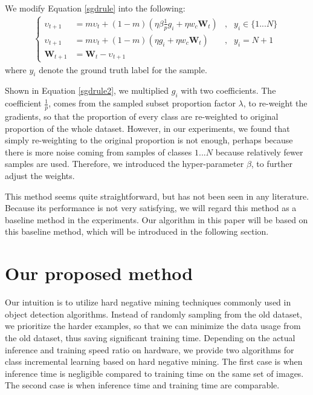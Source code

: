 We modify Equation \ref{sgdrule} into the following:
\begin{align}
\left\{
\begin{aligned}
\upsilon_{t+1} &= m\upsilon_t + (1-m)\left( \eta\beta\frac{1}{p} g_i + \eta w_c \mathbf{W}_t \right)&, &   y_i \in \{1...N\}\\
\upsilon_{t+1} &= m\upsilon_t + (1-m)\left( \eta g_i + \eta w_c \mathbf{W}_t \right)&, &   y_i = N+1\\
\mathbf{W}_{t+1} &= \mathbf{W}_{t} - \upsilon_{t+1}
\end{aligned}
\right.
\label{sgdrule2}
\end{align}
where $y_i$ denote the ground truth label for the sample.

Shown in Equation \ref{sgdrule2}, we multiplied $g_i$ with two coefficients. The coefficient $\frac{1}{p}$, comes from the sampled subset proportion factor $\lambda$, to re-weight the gradients, so that the proportion of every class are re-weighted to original proportion of the whole dataset. However, in our experiments, we found that simply re-weighting to the original proportion is not enough, perhaps because there is more noise coming from samples of classes $1...N$ because relatively fewer samples are used. Therefore, we introduced the hyper-parameter $\beta$, to further adjust the weights.

This method seems quite straightforward, but has not been seen in any literature. Because its performance is not very satisfying, we will regard this method as a baseline method in the experiments. Our algorithm in this paper will be based on this baseline method, which will be introduced in the following section.
\label{baselinesection}

\section{Our proposed method}

Our intuition is to utilize hard negative mining techniques commonly used in object detection algorithms. Instead of randomly sampling from the old dataset, we prioritize the harder examples, so that we can minimize the data usage from the old dataset, thus saving significant training time. Depending on the actual inference and training speed ratio on hardware, we provide two algorithms for class incremental learning based on hard negative mining. The first case is when inference time is negligible compared to training time on the same set of images. The second case is when inference time and training time are comparable.

